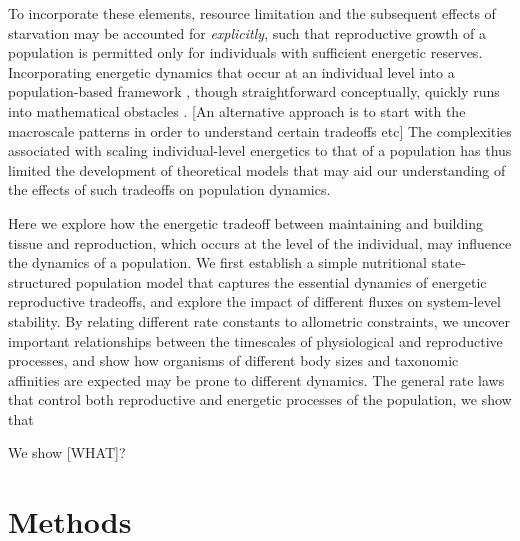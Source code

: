 \documentclass[12pt,english]{article}
\begin{document}
\begin{spacing}{1.9}
To incorporate these elements, resource limitation and the subsequent effects of starvation may be accounted for \emph{explicitly}, such that reproductive growth of a population is permitted only for individuals with sufficient energetic reserves.
Incorporating energetic dynamics that occur at an individual level \citep{Kooi2000} into a population-based framework \citep{Kooi2000,Sousa:2010ez}, though straightforward conceptually, quickly runs into mathematical obstacles \citep{Diekmann:2010da}.
[An alternative approach is to start with the macroscale patterns in order to understand certain tradeoffs etc]
The complexities associated with scaling individual-level energetics to that of a population has thus limited the development of theoretical models that may aid our understanding of the effects of such tradeoffs on population dynamics.

Here we explore how the energetic tradeoff between maintaining and building tissue and reproduction, which occurs at the level of the individual, may influence the dynamics of a population.
We first establish a simple nutritional state-structured population model that captures the essential dynamics of energetic reproductive tradeoffs, and explore the impact of different fluxes on system-level stability.
By relating different rate constants to allometric constraints, we uncover important relationships between the timescales of physiological and reproductive processes, and show how organisms of different body sizes and taxonomic affinities are expected may be prone to different dynamics.
The general rate laws that control both reproductive and energetic processes of the population, we show that 


We show [WHAT]?




\section{Methods}

\end{spacing}
\end{document}
